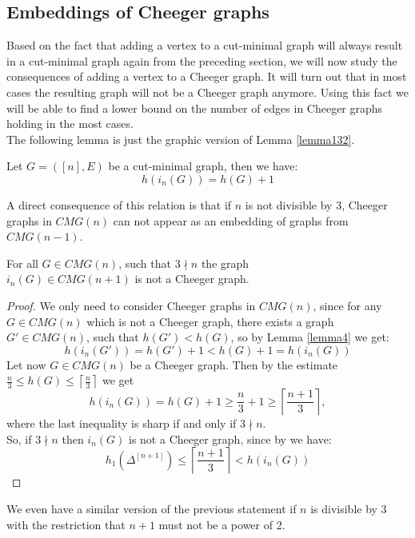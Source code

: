 \subsection{Embeddings of Cheeger graphs}

Based on the fact that adding a vertex to a cut-minimal graph will always result in a cut-minimal graph again from the preceding section, we will now study the consequences of adding a vertex to a Cheeger graph. It will turn out that in most cases the resulting graph will not be a Cheeger graph anymore. Using this fact we will be able to find a lower bound on the number of edges in Cheeger graphs holding in the most cases.\\
The following lemma is just the graphic version of Lemma \ref{lemma132}.

\begin{lem}\label{lemma4}
Let \(G=([n],E)\) be a cut-minimal graph, then we have:
\[
h(i_n(G))=h(G)+1
\]
\end{lem}

A direct consequence of this relation is that if \(n\) is not divisible by 3, Cheeger graphs in \(CMG(n)\) can not appear as an embedding of graphs from \(CMG(n-1)\).

\begin{prop}\label{proposition4}
For all \(G\in CMG(n)\), such that \(3\nmid n\) the graph\\
\(i_n(G)\in CMG(n+1)\) is not a Cheeger graph.
\begin{proof}
We only need to consider Cheeger graphs in \(CMG(n)\), since for any\\
\(G\in CMG(n)\) which is not a Cheeger graph, there exists a graph \(G'\in CMG(n)\), such that \(h(G')<h(G)\), so by Lemma \ref{lemma4} we get:
\[
h(i_n(G'))=h(G')+1<h(G)+1=h(i_n(G))
\]
Let now \(G\in CMG(n)\) be a Cheeger graph. Then by the estimate \(\frac{n}{3}\leq h(G)\leq\left\lceil\frac{n}{3}\right\rceil\) we get
\[
h(i_n(G))=h(G)+1\geq\frac{n}{3}+1\geq\left\lceil\frac{n+1}{3}\right\rceil,
\]
where the last inequality is sharp if and only if \(3\nmid n\).\\
So, if \(3\nmid n\) then \(i_n(G)\) is not a Cheeger graph, since by \cite{1} we have:
\[
h_1(\Delta^{[n+1]})\leq\left\lceil\frac{n+1}{3}\right\rceil<h(i_n(G))
\]
\end{proof}
\end{prop}

We even have a similar version of the previous statement if \(n\) is divisible by 3 with the restriction that \(n+1\) must not be a power of 2.

